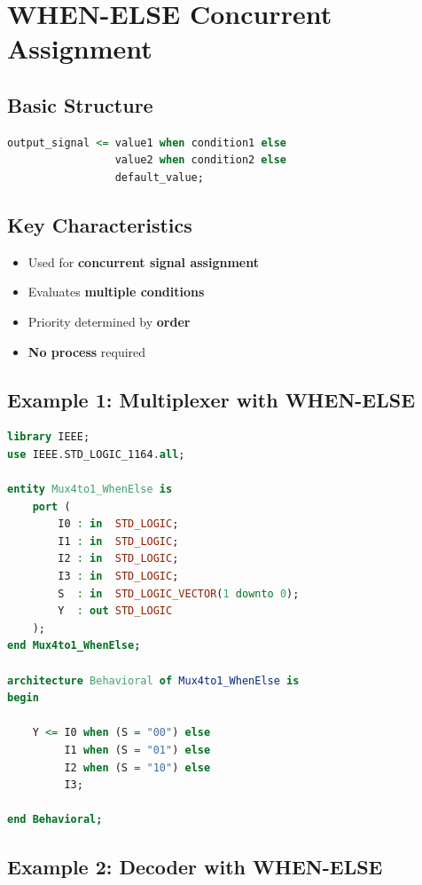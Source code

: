 \documentclass[12pt,a4paper]{article}
\begin{document}
\newpage
\section{WHEN-ELSE Concurrent Assignment}

\subsection{Basic Structure}

\begin{lstlisting}[language=VHDL]
output_signal <= value1 when condition1 else
                 value2 when condition2 else
                 default_value;
\end{lstlisting}

\subsection{Key Characteristics}
\begin{itemize}
    \item Used for \textbf{concurrent signal assignment}
    \item Evaluates \textbf{multiple conditions}
    \item Priority determined by \textbf{order}
    \item \textbf{No process} required
\end{itemize}

\subsection{Example 1: Multiplexer with WHEN-ELSE}

\begin{lstlisting}[language=VHDL]
library IEEE;
use IEEE.STD_LOGIC_1164.all;

entity Mux4to1_WhenElse is
    port (
        I0 : in  STD_LOGIC;
        I1 : in  STD_LOGIC;
        I2 : in  STD_LOGIC;
        I3 : in  STD_LOGIC;
        S  : in  STD_LOGIC_VECTOR(1 downto 0);
        Y  : out STD_LOGIC
    );
end Mux4to1_WhenElse;

architecture Behavioral of Mux4to1_WhenElse is
begin
    
    Y <= I0 when (S = "00") else
         I1 when (S = "01") else
         I2 when (S = "10") else
         I3;
    
end Behavioral;
\end{lstlisting}

\newpage
\subsection{Example 2: Decoder with WHEN-ELSE}
\end{document}
